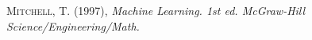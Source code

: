 \begin{thebibliography}{}
 \textsc{Mitchell, T. (1997)},
\textit{Machine Learning. 1st ed. McGraw-Hill Science/Engineering/Math.}

\end{thebibliography}